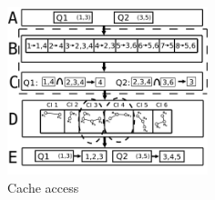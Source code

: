 \begin{figure}
  \center
	\includegraphics[width=0.52\textwidth]{figures/cacheTwoLayer.pdf}
	\caption{Cache access}
  \label{fig:cachestruc}
\end{figure}



